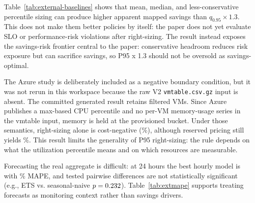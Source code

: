 \documentclass[conference]{IEEEtran}
\begin{document}


Table~\ref{tab:external-baselines} shows that mean, median, and
less-conservative percentile sizing can produce higher apparent mapped savings than
$q_{0.95}\times1.3$. This does not make them better policies by itself: the
paper does not yet evaluate SLO or performance-risk violations after
right-sizing. The result instead exposes the savings-risk frontier central to
the paper: conservative headroom reduces risk exposure but can sacrifice
savings, so P95 x 1.3 should not be oversold as savings-optimal.

The Azure study is deliberately included as a negative boundary condition, but
it was not rerun in this workspace because the raw V2
\texttt{vmtable.csv.gz} input is absent. The committed generated result retains
\azVms{} filtered VMs. Since Azure publishes a max-based CPU percentile and no
per-VM memory-usage series in the vmtable input, memory is held at the
provisioned bucket. Under those semantics, right-sizing alone is cost-negative
(\azSavingsPct\%), although reserved pricing still yields \azSavingsPctRi\%.
This result limits the generality of P95 right-sizing: the rule depends on
what the utilization percentile means and on which resources are measurable.

Forecasting the real aggregate is difficult: at 24 hours the best hourly model
is \extBestModel{} with \extBestMape\% MAPE, and tested pairwise differences
are not statistically significant (e.g., ETS vs. seasonal-naive
$p=0.232$). Table~\ref{tab:extmape} supports treating forecasts as
monitoring context rather than savings drivers.

\begin{table}[t]
\caption{Study II real Rnd aggregate forecasting MAPE (\%, mean $\pm$ sd).}
\label{tab:extmape}
\centering
\renewcommand{\arraystretch}{1.08}

\end{table}
\end{document}
